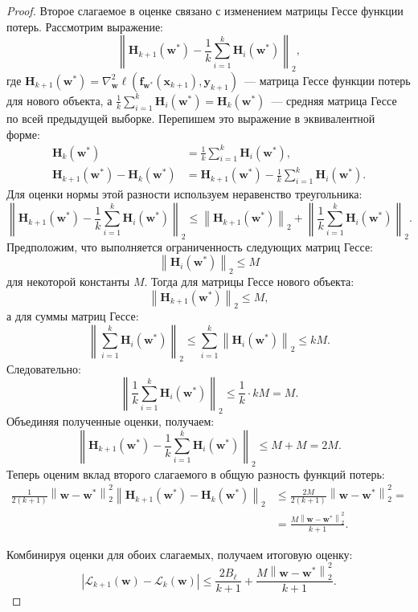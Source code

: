 \begin{proof}
Второе слагаемое в оценке связано с изменением матрицы Гессе функции потерь. Рассмотрим выражение:
\[
    \left\| \mathbf{H}_{k+1}(\mathbf{w}^*) - \frac{1}{k} \sum_{i=1}^{k} \mathbf{H}_i(\mathbf{w}^*) \right\|_2,
\]
где $\mathbf{H}_{k+1}(\mathbf{w}^*) = \nabla^2_{\mathbf{w}} \ell(\mathbf{f}_{\mathbf{w}^*}(\mathbf{x}_{k+1}), \mathbf{y}_{k+1})$~--- матрица Гессе функции потерь для нового объекта, а $\frac{1}{k} \sum_{i=1}^{k} \mathbf{H}_i(\mathbf{w}^*) = \mathbf{H}_k(\mathbf{w}^*)$~--- средняя матрица Гессе по всей предыдущей выборке.
Перепишем это выражение в эквивалентной форме:
\begin{align}
    \mathbf{H}_k(\mathbf{w}^*) &= \frac{1}{k} \sum_{i=1}^{k} \mathbf{H}_i(\mathbf{w}^*),\\
    \mathbf{H}_{k+1}(\mathbf{w}^*) - \mathbf{H}_k(\mathbf{w}^*) &= \mathbf{H}_{k+1}(\mathbf{w}^*) - \frac{1}{k} \sum_{i=1}^{k} \mathbf{H}_i(\mathbf{w}^*).
\end{align}
Для оценки нормы этой разности используем неравенство треугольника:
\[
    \left\| \mathbf{H}_{k+1}(\mathbf{w}^*) - \frac{1}{k} \sum_{i=1}^{k} \mathbf{H}_i(\mathbf{w}^*) \right\|_2 \leqslant \left\| \mathbf{H}_{k+1}(\mathbf{w}^*) \right\|_2 + \left\| \frac{1}{k} \sum_{i=1}^{k} \mathbf{H}_i(\mathbf{w}^*) \right\|_2.
\]
Предположим, что выполняется ограниченность следующих матриц Гессе:
\[
    \left\| \mathbf{H}_i(\mathbf{w}^*) \right\|_2 \leqslant M
\]
для некоторой константы $M$.
Тогда для матрицы Гессе нового объекта:
\[
    \left\| \mathbf{H}_{k+1}(\mathbf{w}^*) \right\|_2 \leqslant M,
\]
а для суммы матриц Гессе:
\[
    \left\| \sum_{i=1}^{k} \mathbf{H}_i(\mathbf{w}^*) \right\|_2 \leqslant \sum_{i=1}^{k} \left\| \mathbf{H}_i(\mathbf{w}^*) \right\|_2 \leqslant k M.
\]
Следовательно:
\[
    \left\| \frac{1}{k} \sum_{i=1}^{k} \mathbf{H}_i(\mathbf{w}^*) \right\|_2 \leqslant \frac{1}{k} \cdot k M = M.
\]
Объединяя полученные оценки, получаем:
\[
    \left\| \mathbf{H}_{k+1}(\mathbf{w}^*) - \frac{1}{k} \sum_{i=1}^{k} \mathbf{H}_i(\mathbf{w}^*) \right\|_2 \leqslant M + M = 2M.
\]
Теперь оценим вклад второго слагаемого в общую разность функций потерь:
\begin{align}
    \frac{1}{2 (k+1)} \left\| \mathbf{w} - \mathbf{w}^* \right\|_2^2 \left\| \mathbf{H}_{k+1}(\mathbf{w}^*) - \mathbf{H}_k(\mathbf{w}^*) \right\|_2 &\leqslant \frac{2M}{2 (k+1)} \left\| \mathbf{w} - \mathbf{w}^* \right\|_2^2 = \\
    &=\frac{M \left\| \mathbf{w} - \mathbf{w}^* \right\|_2^2}{k+1}.
\end{align}

Комбинируя оценки для обоих слагаемых, получаем итоговую оценку:
\[
    \left| \mathcal{L}_{k+1}(\mathbf{w}) - \mathcal{L}_k(\mathbf{w}) \right| \leqslant \frac{2B_{\ell}}{k+1} + \frac{M \left\| \mathbf{w} - \mathbf{w}^* \right\|_2^2}{k+1}.
\]
\end{proof}

